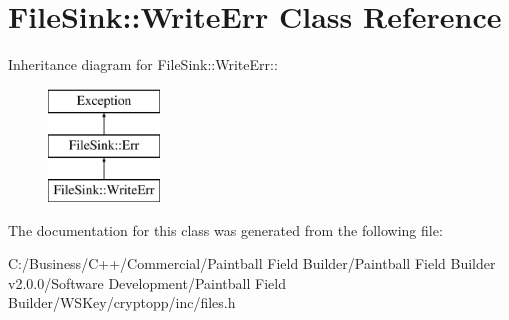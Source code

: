\hypertarget{class_file_sink_1_1_write_err}{
\section{FileSink::WriteErr Class Reference}
\label{class_file_sink_1_1_write_err}
}
Inheritance diagram for FileSink::WriteErr::\begin{figure}[H]
\begin{center}
\leavevmode
\includegraphics[height=3cm]{class_file_sink_1_1_write_err}
\end{center}
\end{figure}


The documentation for this class was generated from the following file:\begin{DoxyCompactItemize}
\item 
C:/Business/C++/Commercial/Paintball Field Builder/Paintball Field Builder v2.0.0/Software Development/Paintball Field Builder/WSKey/cryptopp/inc/files.h\end{DoxyCompactItemize}
